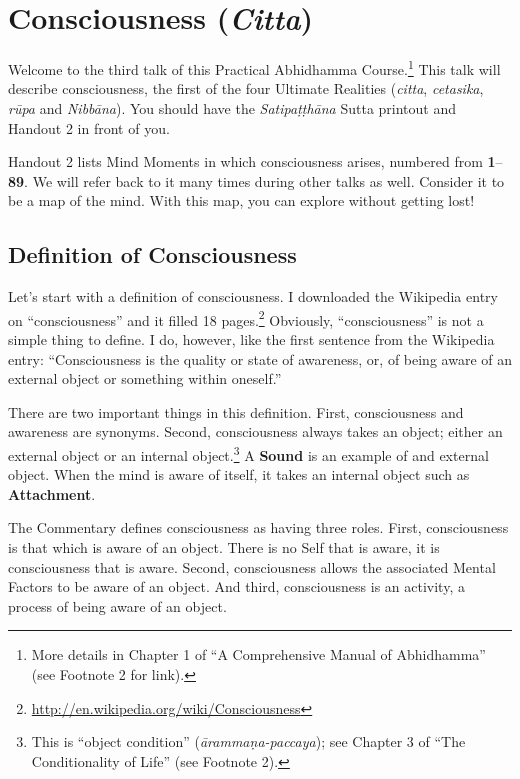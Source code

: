 \section{Consciousness (\textit{Citta})}

Welcome to the third talk of this Practical Abhidhamma Course.\footnote{More details in Chapter 1 of “A Comprehensive Manual of Abhidhamma” (see Footnote 2 for link).} This talk will describe consciousness, the first of the four Ultimate Realities (\textit{citta}, \textit{cetasika}, \textit{rūpa} and \textit{Nibbāna}). You should have the \textit{Satipaṭṭhāna} Sutta printout and Handout 2 in front of you. 

Handout 2 lists Mind Moments in which consciousness arises, numbered from \textbf{1}--\textbf{89}. We will refer back to it many times during other talks as well. Consider it to be a map of the mind. With this map, you can explore without getting lost!

\subsection*{Definition of Consciousness}

Let’s start with a definition of consciousness. I downloaded the Wikipedia entry on “consciousness” and it filled 18 pages.\footnote{\url{http://en.wikipedia.org/wiki/Consciousness}} Obviously, “consciousness” is not a simple thing to define. I do, however, like the first sentence from the Wikipedia entry: “Consciousness is the quality or state of awareness, or, of being aware of an external object or something within oneself.”

There are two important things in this definition. First, consciousness and awareness are synonyms. Second, consciousness always takes an object; either an external object or an internal object.\footnote{This is “object condition” (\textit{ārammaṇa-paccaya}); see Chapter 3 of “The Conditionality of Life” (see Footnote 2).} A \textbf{Sound} is an example of and external object. When the mind is aware of itself, it takes an internal object such as \textbf{Attachment}.

The Commentary defines consciousness as having three roles. First, consciousness is that which is aware of an object. There is no Self that is aware, it is consciousness that is aware. Second, consciousness allows the associated Mental Factors to be aware of an object. And third, consciousness is an activity, a process of being aware of an object.


